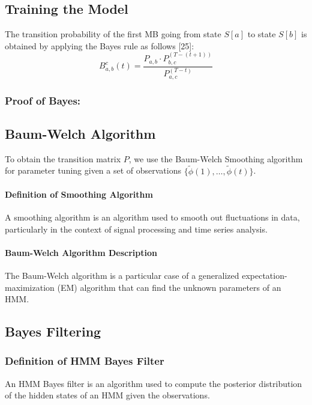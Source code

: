 \documentclass[12pt]{report} %
\begin{document}
\subsection{Training the Model}

The transition probability of the first MB going from state $S[a]$ to state $S[b]$ is obtained by applying the Bayes rule as follows [25]:
\begin{equation}
B^{c}_{a,b}(t) = \frac{P_{a,b} \cdot P^{(T-(t+1))}_{b,c}}{P^{(T-t)}_{a,c}}
\end{equation}

\subsubsection{Proof of Bayes:}

\subsection{Baum-Welch Algorithm}
To obtain the transition matrix $P$, we use the Baum-Welch Smoothing algorithm for parameter tuning given a set of observations $\{\tilde{\phi}(1), \ldots, \tilde{\phi}(t)\}$.

\paragraph{Definition of Smoothing Algorithm}
A smoothing algorithm is an algorithm used to smooth out fluctuations in data, particularly in the context of signal processing and time series analysis.

\paragraph{Baum-Welch Algorithm Description}
The Baum-Welch algorithm is a particular case of a generalized expectation-maximization (EM) algorithm that can find the unknown parameters of an HMM.

\subsection{Bayes Filtering}

\subsubsection{Definition of HMM Bayes Filter}
An HMM Bayes filter is an algorithm used to compute the posterior distribution of the hidden states of an HMM given the observations.
\end{document}

